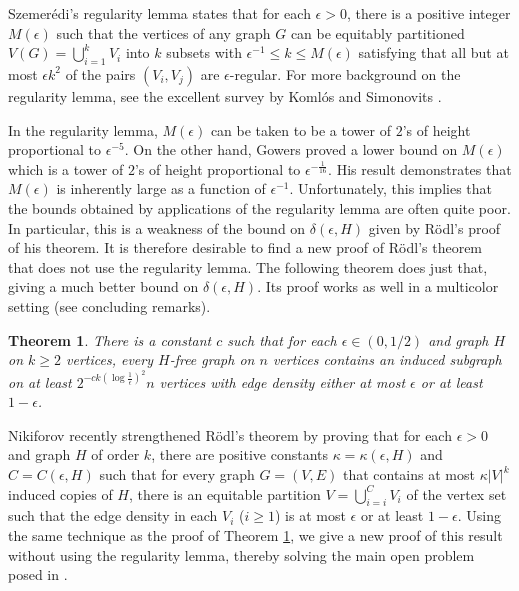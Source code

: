 \documentclass[11pt]{article}
\newtheorem{theorem}{Theorem}[section]
\begin{document}
Szemer\'edi's regularity lemma \cite{Sz} states that for each
$\epsilon>0$, there is a positive integer $M(\epsilon)$ such that
the vertices of any graph $G$ can be equitably partitioned
$V(G)=\bigcup_{i=1}^k V_i$ into $k$ subsets with $\epsilon^{-1}
\leq k \leq M(\epsilon)$ satisfying that all but at most $\epsilon
k^2$ of the pairs $(V_i,V_j)$ are $\epsilon$-regular. For more
background on the regularity lemma, see the excellent
survey by Koml\'os and Simonovits \cite{KoSi}.

In the regularity lemma, $M(\epsilon)$ can be taken to be a tower of
$2$'s of height proportional to $\epsilon^{-5}$. On the other hand,
Gowers \cite{Go} proved a lower bound on $M(\epsilon)$ which is a
tower of $2$'s of height proportional to $\epsilon^{-\frac{1}{16}}$.
His result demonstrates that $M(\epsilon)$ is inherently large as a
function of $\epsilon^{-1}$. Unfortunately, this implies that the
bounds obtained by applications of the regularity lemma are often
quite poor. In particular, this is a weakness of the bound on
$\delta(\epsilon,H)$ given by R\"odl's proof of his theorem. It is
therefore desirable to find a new proof of R\"odl's theorem that
does not use the regularity lemma. The following theorem does just
that, giving a much better bound on $\delta(\epsilon,H)$. Its proof
works as well in a multicolor setting (see concluding remarks).

\begin{theorem} \label{main}
There is a constant $c$ such that for each $\epsilon \in (0,1/2)$
and graph $H$ on $k \geq 2$ vertices, every $H$-free graph on $n$
vertices contains an induced subgraph on at least $2^{-ck(\log
\frac{1}{\epsilon})^2}n$ vertices with edge density either at most
$\epsilon$ or at least $1-\epsilon$.
\end{theorem}

Nikiforov \cite{Ni} recently strengthened R\"odl's theorem by
proving that for each $\epsilon>0$ and graph $H$ of order $k$, there
are positive constants $\kappa=\kappa(\epsilon,H)$ and
$C=C(\epsilon,H)$ such that for every graph $G=(V,E)$ that
contains at most $\kappa|V|^{k}$ induced copies of $H$, there is an
equitable partition $V=\bigcup_{i=i}^C V_i$ of the vertex set such
that the edge density in each $V_i$ ($i \geq 1$) is at most
$\epsilon$ or at least $1-\epsilon$. Using the same technique as the
proof of Theorem \ref{main}, we give a new proof of this result
without using the regularity lemma, thereby solving the main open problem
posed in \cite{Ni}.
\end{document}
